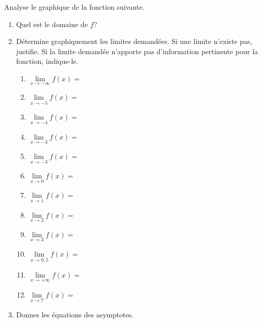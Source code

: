 \documentclass[a4paper,12pt]{report}
\newcommand{\pinf}{+\infty}
\newcommand{\minf}{-\infty}
\begin{document}
\begin{exercice}
Analyse le graphique de la fonction suivante.
\begin{center}

\end{center}
\begin{enumerate}
\item Quel est le domaine de \(f\)? \dotfill
\item Détermine graphiquement les limites demandées. Si une limite
n'existe pas, justifie. Si la limite demandée n'apporte pas
d'information pertinente pour la fonction, indique-le.
\begin{center}
\par \setlength{\columnseprule}{0 pt}
          \begin{minipage}[t]{\linewidth}
          \begin{multicols}{3}

\begin{enumerate}
\item \(\lim\limits_{x\to \minf}f(x)=\) \dotfill
\item \(\lim\limits_{x\to -5}f(x)=\) \dotfill
\item \(\lim\limits_{x\to -4}f(x)=\) \dotfill
\item \(\lim\limits_{x\to -3}f(x)=\) \dotfill
\item \(\lim\limits_{x\to -3}f(x)=\) \dotfill
\item \(\lim\limits_{x\to 0}f(x)=\) \dotfill
\item \(\lim\limits_{x\to 1}f(x)=\) \dotfill
\item \(\lim\limits_{x\to 2}f(x)=\) \dotfill
\item \(\lim\limits_{x\to 3}f(x)=\) \dotfill
\item \(\lim\limits_{x\to 0,5}f(x)=\) \dotfill
\item \(\lim\limits_{x\to \pinf}f(x)=\) \dotfill
\item \(\lim\limits_{x\to 7}f(x)=\) \dotfill
\end{enumerate}


\end{multicols}\end{minipage}
\end{center}
\item Donnes les équations des asymptotes.
\end{enumerate}
\end{exercice}
\end{document}
